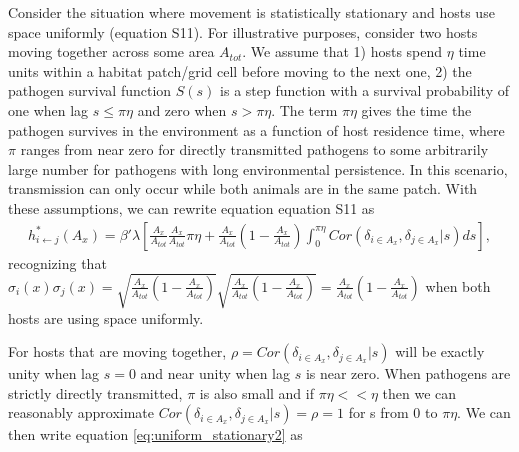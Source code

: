 ﻿\documentclass[11pt]{article}
\begin{document}
Consider the situation where movement is statistically stationary and hosts use space uniformly (equation S11). 
For illustrative purposes, consider two hosts moving together across some area $A_{tot}$. We assume that 1) hosts spend $\eta$ time units within a habitat patch/grid cell before moving to the next one, 2) the pathogen survival function $S(s)$ is a step function with a survival probability of one when lag $s \leq \pi \eta$ and zero when $s > \pi \eta$.  
The term $\pi \eta$ gives the time the pathogen survives in the environment as a function of host residence time, where $\pi$ ranges from near zero for directly transmitted pathogens to some arbitrarily large number for pathogens with long environmental persistence.  
In this scenario, transmission can only occur while both animals are in the same patch. With these assumptions, we can rewrite equation equation S11 as 
\begin{equation}
    \begin{aligned}
        h^*_{i \leftarrow j}(A_x) = \beta' \lambda \left[\frac{A_x}{A_{tot}}\frac{A_x}{A_{tot}} \pi \eta + \frac{A_x}{A_{tot}}(1 - \frac{A_x}{A_{tot}}) \int_{0}^{\pi \eta} Cor(\delta_{i \in A_x}, \delta_{j \in A_x} | s) ds\right],
    \end{aligned}
    \label{eq:uniform_stationary2}
\end{equation}
recognizing that $\sigma_i(x) \sigma_j(x) = \sqrt{\frac{A_x}{A_{tot}}(1 - \frac{A_x}{A_{tot}})}\sqrt{\frac{A_x}{A_{tot}}(1 - \frac{A_x}{A_{tot}})} = \frac{A_x}{A_{tot}}(1 - \frac{A_x}{A_{tot}})$ when both hosts are using space uniformly.

For hosts that are moving together, $\rho = Cor(\delta_{i \in A_x}, \delta_{j \in A_x} | s)$ will be exactly unity when lag $s = 0$ and near unity when lag $s$ is near zero. When pathogens are strictly directly transmitted, $\pi$ is also small and if $\pi \eta << \eta$ then we can reasonably approximate $Cor(\delta_{i \in A_x}, \delta_{j \in A_x} | s) = \rho = 1$ for s from 0 to $\pi \eta$.  We can then write equation \ref{eq:uniform_stationary2} as 
\end{document}
